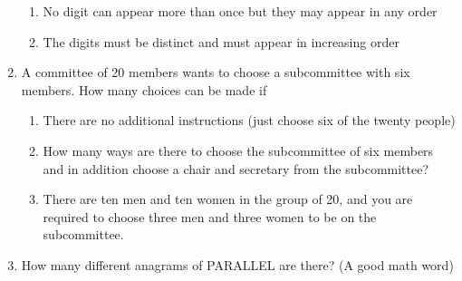 \documentclass[12pt]{article}
\begin{document}
\begin{enumerate}
\begin{enumerate}
\item  No digit can appear more than once but they may appear in any order

\item  The digits must be distinct and must appear in increasing order

\end{enumerate}


\item  A committee of 20 members wants to choose a subcommittee with six members.  How many choices can be made if

\begin{enumerate}
\item  There are no additional instructions (just choose six of the twenty people)


\item  How many ways are there to choose the subcommittee of six members and in addition choose a chair and secretary from the subcommittee?

\item  There are ten men and ten women in the group of 20, and you are required to choose three men and three women to be on the subcommittee.

\end{enumerate}

\item   How many different anagrams of PARALLEL are there?  (A good math word)




\end{enumerate}
\end{document}
